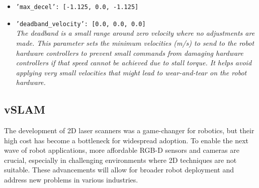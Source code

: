\begin{itemize}
    \item \texttt{\textcolor{OliveGreen}{'max\_decel'}: [\textcolor{OliveGreen}{-1.125, 0.0, -1.125}]}
    
    \item \texttt{\textcolor{OliveGreen}{'deadband\_velocity'}: [\textcolor{OliveGreen}{0.0, 0.0, 0.0}]}\\
    \textit{The deadband is a small range around zero velocity where no adjustments are made. This parameter sets the minimum velocities (m/s) to send to the robot hardware controllers to prevent small commands from damaging hardware controllers if that speed cannot be achieved due to stall torque. It helps avoid applying very small velocities that might lead to wear-and-tear on the robot hardware.}
    
\end{itemize}
\subsection{vSLAM}
The development of 2D laser scanners was a game-changer for robotics, but their high cost has become a bottleneck for widespread adoption. To enable the next wave of robot applications, more affordable RGB-D sensors and cameras are crucial, especially in challenging environments where 2D techniques are not suitable. These advancements will allow for broader robot deployment and address new problems in various industries. 

